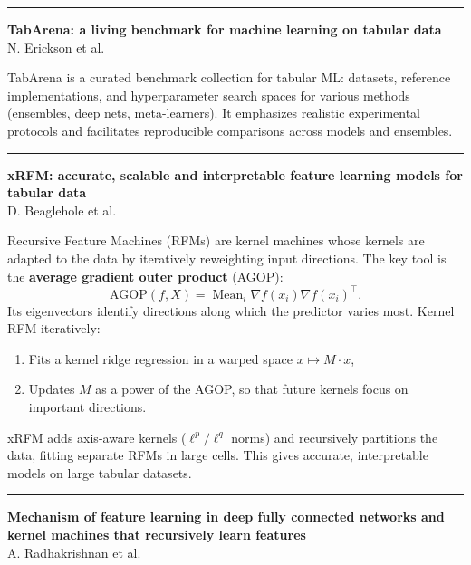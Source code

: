 \documentclass[a5paper]{article}
\providecommand{\tightlist}{%
  \setlength{\itemsep}{0pt}\setlength{\parskip}{0pt}}
\begin{document}
\begin{center}\rule{0.5\linewidth}{0.5pt}\end{center}

\textbf{TabArena: a living benchmark for machine learning on tabular
data}\\
N. Erickson et al.

TabArena is a curated benchmark collection for tabular ML: datasets,
reference implementations, and hyperparameter search spaces for various
methods (ensembles, deep nets, meta-learners). It emphasizes realistic
experimental protocols and facilitates reproducible comparisons across
models and ensembles.

\begin{center}\rule{0.5\linewidth}{0.5pt}\end{center}

\textbf{xRFM: accurate, scalable and interpretable feature learning
models for tabular data}\\
D. Beaglehole et al.

Recursive Feature Machines (RFMs) are kernel machines whose kernels are
adapted to the data by iteratively reweighting input directions. The key
tool is the \textbf{average gradient outer product} (AGOP):
\[ \text{AGOP}(f,X) = \operatorname{Mean}_i
\nabla f(x_i) \nabla f(x_i)^\top. \]
Its eigenvectors identify directions along which the predictor varies
most. Kernel RFM iteratively:

\begin{enumerate}
\def\labelenumi{\arabic{enumi}.}
\tightlist
\item
  Fits a kernel ridge regression in a warped space $x\mapsto M\cdot x$,
\item
  Updates $M$ as a power of the AGOP, so that future kernels focus on
  important directions.
\end{enumerate}

xRFM adds axis-aware kernels ($\ell^p / \ell^q$ norms) and recursively partitions
the data, fitting separate RFMs in large cells. This gives accurate,
interpretable models on large tabular datasets.

\begin{center}\rule{0.5\linewidth}{0.5pt}\end{center}

\textbf{Mechanism of feature learning in deep fully connected networks
and kernel machines that recursively learn features}\\
A. Radhakrishnan et al.
\end{document}
